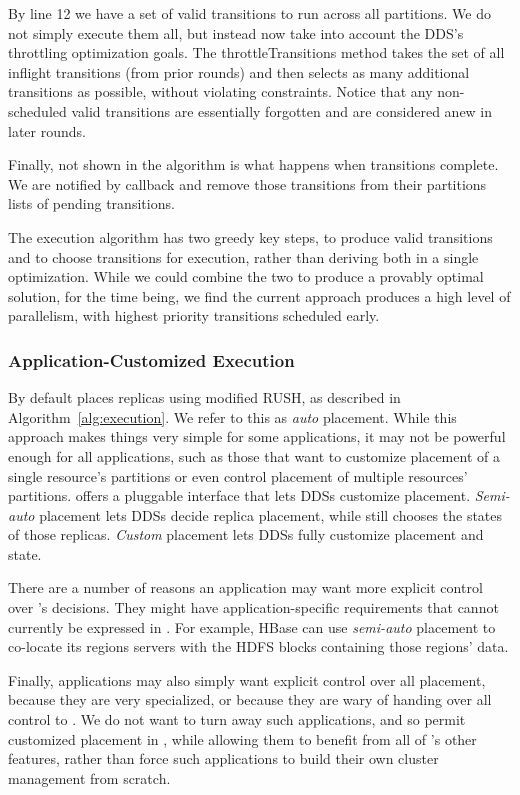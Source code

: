 By line 12 we have a set of valid transitions to run
across all partitions.  We do not simply execute them all, but instead now take
into account the DDS's throttling optimization goals.  The throttleTransitions
method takes the set of all inflight transitions (from prior rounds) and then
selects as many additional transitions as possible, without violating
constraints.  Notice that any non-scheduled valid transitions are essentially
forgotten and are considered anew in later rounds.

Finally, not shown in the algorithm is what happens when transitions complete.
We are notified by callback and remove those transitions from their partitions
lists of pending transitions.

The execution algorithm has two greedy key steps, to produce valid transitions and to
choose transitions for execution, rather than deriving both in a single
optimization.
While we could combine the two to produce a provably optimal solution, for the
time being, we find the current approach produces a high level of parallelism,
with highest priority transitions scheduled early.

\subsubsection{Application-Customized Execution}
\label{sec:placement}
%
By default \helix places replicas using modified RUSH, as described in
Algorithm~\ref{alg:execution}.  We refer to this as \emph{auto} placement.  
While this approach makes things very simple for some applications, it may not
be powerful enough for all applications, such as those that want to customize
placement of a single resource's partitions or even control placement of
multiple resources' partitions. 
\helix offers a pluggable interface 
that lets DDSs customize placement.  \emph{Semi-auto} placement lets DDSs decide
replica placement, while \helix still chooses the states of those replicas.
\emph{Custom} placement lets DDSs fully customize placement and state.

There are a number of reasons an application may want more explicit control over
\helix's decisions.  They might have application-specific requirements that
cannot currently be expressed in \helix.  For example, HBase can use \emph{semi-auto}
placement to co-locate its regions servers with the HDFS blocks
containing those regions' data.  

Finally, applications may also simply want explicit
control over all placement, because they are very specialized, or because they
are wary of handing over all control to \helix.   We do not want to turn away
such applications, and so permit customized placement in \helix, while allowing
them to benefit from all of \helix's other features, rather than 
force such applications to build their own cluster management from scratch.


